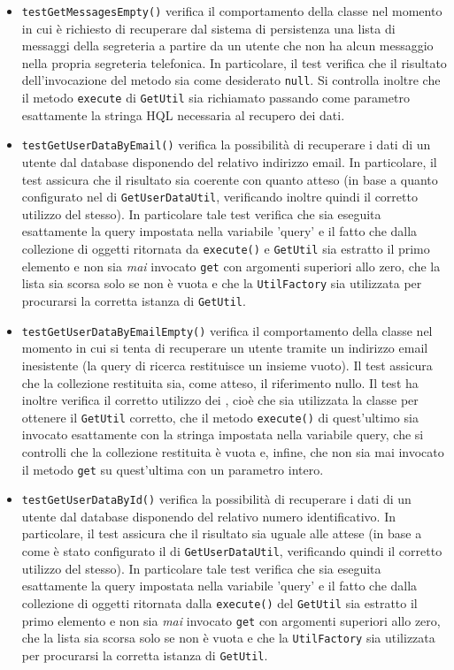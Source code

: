 \begin{itemize}
\begin{itemize}
\item \texttt{testGetMessagesEmpty()} verifica il comportamento della classe nel momento in cui è richiesto di recuperare dal sistema di persistenza una lista di messaggi della segreteria a partire da un utente che non ha alcun messaggio nella propria segreteria telefonica. In particolare, il test verifica che il risultato dell'invocazione del metodo sia come desiderato \texttt{null}.
Si controlla inoltre che il metodo \texttt{execute} di \texttt{GetUtil} sia richiamato passando come parametro esattamente la stringa HQL necessaria al recupero dei dati.

\item \texttt{testGetUserDataByEmail()} verifica la possibilità di recuperare i dati di un utente dal database disponendo del relativo indirizzo email. In particolare, il test assicura che il risultato sia coerente con quanto atteso (in base a quanto configurato nel \underline{} di \texttt{GetUserDataUtil}, verificando inoltre quindi il corretto utilizzo del  stesso). In particolare tale test verifica che sia eseguita esattamente la query impostata nella variabile 'query' e il fatto che dalla collezione di oggetti ritornata da \texttt{execute()} e \texttt{GetUtil} sia estratto il primo elemento e non sia \textit{mai} invocato \texttt{get} con argomenti superiori allo zero, che la lista sia scorsa solo se non è vuota e che la \texttt{UtilFactory} sia utilizzata per procurarsi la corretta istanza di \texttt{GetUtil}.

\item \texttt{testGetUserDataByEmailEmpty()} verifica il comportamento della classe nel momento in cui si tenta di recuperare un utente tramite un indirizzo email inesistente (la query di ricerca restituisce un insieme vuoto). Il test assicura che la collezione restituita sia, come atteso, il riferimento nullo. Il test ha inoltre verifica il corretto utilizzo dei , cioè che sia utilizzata la classe  per ottenere il \texttt{GetUtil} corretto, che il metodo \texttt{execute()} di quest'ultimo sia invocato esattamente con la stringa impostata nella variabile query, che si controlli che la collezione restituita è vuota e, infine, che non sia mai invocato il metodo \texttt{get} su quest'ultima con un parametro intero.

\item \texttt{testGetUserDataById()} verifica la possibilità di recuperare i dati di un utente dal database disponendo del relativo numero identificativo. In particolare, il test assicura che il risultato sia uguale alle attese (in base a come è stato configurato il  di \texttt{GetUserDataUtil}, verificando quindi il corretto utilizzo del  stesso). In particolare tale test verifica che sia eseguita esattamente la query impostata nella variabile 'query' e il fatto che dalla collezione di oggetti ritornata dalla \texttt{execute()} del \texttt{GetUtil} sia estratto il primo elemento e non sia \textit{mai} invocato \texttt{get} con argomenti superiori allo zero, che la lista sia scorsa solo se non è vuota e che la \texttt{UtilFactory} sia utilizzata per procurarsi la corretta istanza di \texttt{GetUtil}.


\end{itemize}
\end{itemize}
